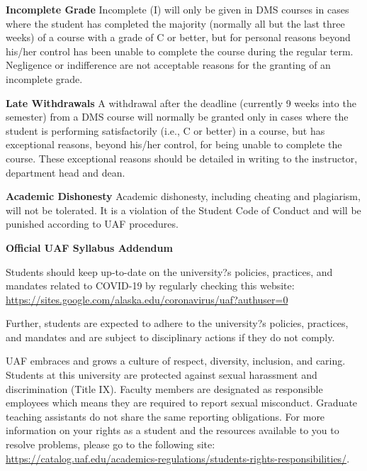 \documentclass[12pt]{article}
\begin{document}
\textbf{Incomplete Grade} 
Incomplete (I) will only be given in DMS courses in cases where the student has completed the majority (normally all but the last three weeks) of a course with a grade of C or better, but for personal reasons beyond his/her control has been unable to complete the course during the regular term. Negligence or indifference are not acceptable reasons for the granting of an incomplete grade. 

\textbf{Late Withdrawals} 
A withdrawal after the deadline (currently 9 weeks into the semester) from a DMS course will normally be granted only in cases where the student is performing satisfactorily (i.e., C or better) in a course, but has exceptional reasons, beyond his/her control, for being unable to complete the course. These exceptional reasons should be detailed in writing to the instructor, department head and dean.


\textbf{Academic Dishonesty}
Academic dishonesty, including cheating and plagiarism, will not
be tolerated.  It is a violation of the Student Code of Conduct
and will be punished according to UAF procedures.

\newpage

\textbf{\large{Official UAF Syllabus Addendum}}
 
\hfill

 Students should keep up-to-date on the university?s policies, practices, and mandates related to COVID-19 by regularly checking this website: \url{https://sites.google.com/alaska.edu/coronavirus/uaf?authuser=0}

Further, students are expected to adhere to the university?s policies, practices, and mandates and are subject to disciplinary actions if they do not comply.

 UAF embraces and grows a culture of respect, diversity, inclusion, and caring. Students at this university are protected against sexual harassment and discrimination (Title IX). Faculty members are designated as responsible employees which means they are required to report sexual misconduct. Graduate teaching assistants do not share the same reporting obligations. For more information on your rights as a student and the resources available to you to resolve problems, please go to the following site: \url{https://catalog.uaf.edu/academics-regulations/students-rights-responsibilities/}.
\end{document}
